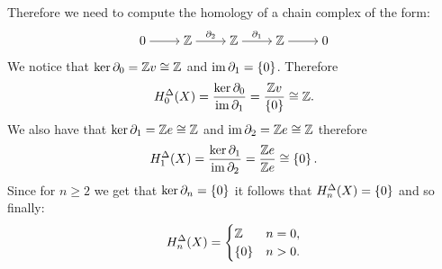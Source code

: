 \documentclass[11pt,a4paper]{article}
\begin{document}
\begin{solution}
\begin{align*}
  \end{align*}
  Therefore we need to compute the homology of a chain complex of the form:
  \[\begin{tikzcd}[ampersand replacement=\&,cramped]
    0 \& \Z \& {\Z} \& {\Z} \& 0
    \arrow[from=1-1, to=1-2]
    \arrow["{\partial_2}", from=1-2, to=1-3]
    \arrow["{\partial_1}", from=1-3, to=1-4]
    \arrow[from=1-4, to=1-5]
  \end{tikzcd}\]
  We notice that $\ker \partial_0 = \mathbb{Z} v \cong \mathbb{Z}$
  and $\operatorname{im} \partial_1 = \left\{0\right\}$.
  Therefore
  \[
    H_0^{\Delta}(X) =
    \frac{\ker \partial_0}{\operatorname{im} \partial_1} =
    \frac{\mathbb{Z} v}{\left\{0\right\}} \cong \mathbb{Z}.
  \]
  We also have that $\ker \partial_1 = \mathbb{Z} e \cong \mathbb{Z}$
  and $\operatorname{im} \partial_2 = \mathbb{Z} e \cong \mathbb{Z}$ therefore
  \[
    H_1^{\Delta}(X) =
    \frac{\ker \partial_1}{\operatorname{im} \partial_2} =
    \frac{\mathbb{Z} e}{\mathbb{Z} e} \cong \left\{0\right\}.
  \]
  Since for $n \geq 2$ we get that $\ker \partial_n = \left\{0\right\}$ it follows
  that $H_n^{\Delta}(X) = \left\{0\right\}$ and so finally:
  \[
    H^{\Delta}_n(X) =
    \begin{cases}
      \mathbb{Z} &n = 0, \\
      \left\{0\right\} &n > 0.
    \end{cases}
  \]
\end{solution}
\end{document}
